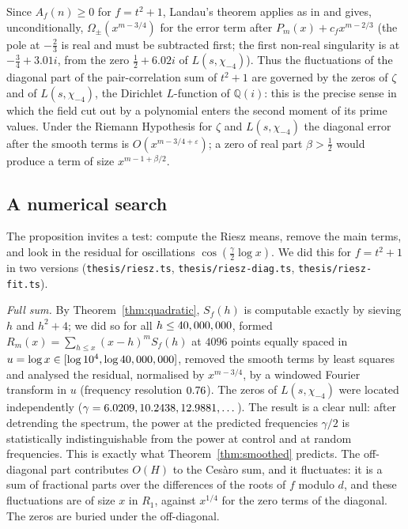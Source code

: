 \documentclass[11pt,a4paper]{article}
\theoremstyle{remark}\newtheorem{remark}[theorem]{Remark}
\newcommand{\Q}{\mathbb{Q}}
\begin{document}
Since $A_f(n)\ge0$ for $f=t^2+1$, Landau's theorem applies as in \cite[Theorem~4]{GoldstonSuriajaya2021} and
gives, unconditionally, $\Omega_\pm(x^{m-3/4})$ for the error term after $P_m(x)+c_fx^{m-2/3}$ (the pole at
$-\tfrac23$ is real and must be subtracted first; the first non-real singularity is at $-\tfrac34+3.01i$,
from the zero $\tfrac12+6.02i$ of $L(s,\chi_{-4})$). Thus the fluctuations of the diagonal
part of the pair-correlation sum of $t^2+1$ are governed by the zeros of $\zeta$ and of $L(s,\chi_{-4})$,
the Dirichlet $L$-function of $\Q(i)$: this is the precise sense in which the field cut out by a
polynomial enters the second moment of its prime values. Under the Riemann Hypothesis for $\zeta$ and
$L(s,\chi_{-4})$ the diagonal error after the smooth terms is $O(x^{m-3/4+\varepsilon})$; a zero of real
part $\beta>\tfrac12$ would produce a term of size $x^{m-1+\beta/2}$.

\subsection{A numerical search}

The proposition invites a test: compute the Riesz means, remove the main terms, and look in the residual for
oscillations $\cos(\tfrac{\gamma}{2}\log x)$. We did this for $f=t^2+1$ in two versions
(\texttt{thesis/riesz.ts}, \texttt{thesis/riesz-diag.ts}, \texttt{thesis/riesz-fit.ts}).

\emph{Full sum.} By Theorem~\ref{thm:quadratic}, $S_f(h)$ is computable exactly by sieving $h$ and
$h^2+4$; we did so for all $h\le40,000,000$, formed $R_m(x)=\sum_{h\le x}(x-h)^mS_f(h)$ at $4096$ points
equally spaced in $u=\log x\in[\log10^4,\log40,000,000]$, removed the smooth terms by least squares and
analysed the residual, normalised by $x^{m-3/4}$, by a windowed Fourier transform in $u$ (frequency
resolution $0.76$). The zeros of $L(s,\chi_{-4})$ were located independently
($\gamma=6.0209,10.2438,12.9881,\dots$). The result is a clear null: after detrending the
spectrum, the power at the predicted frequencies $\gamma/2$ is statistically indistinguishable from the
power at control and at random frequencies. This is exactly what Theorem~\ref{thm:smoothed} predicts.
The off-diagonal part contributes $O(H)$ to the Ces\`aro sum, and it fluctuates: it is a sum of
fractional parts over the differences of the roots of $f$ modulo $d$, and these fluctuations are of
size $x$ in $R_1$, against $x^{1/4}$ for the zero terms of the diagonal. The zeros are buried under the
off-diagonal.
\end{document}
